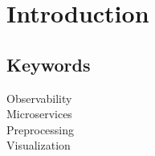 
\chapter{Introduction} %

\label{Chapter1} %


\newcommand{\keyword}[1]{\textbf{#1}}
\newcommand{\tabhead}[1]{\textbf{#1}}
\newcommand{\code}[1]{\texttt{#1}}
\newcommand{\file}[1]{\texttt{\bfseries#1}}
\newcommand{\option}[1]{\texttt{\itshape#1}}


\section{Keywords}

Observability \\
Microservices \\
Preprocessing \\
Visualization \\


